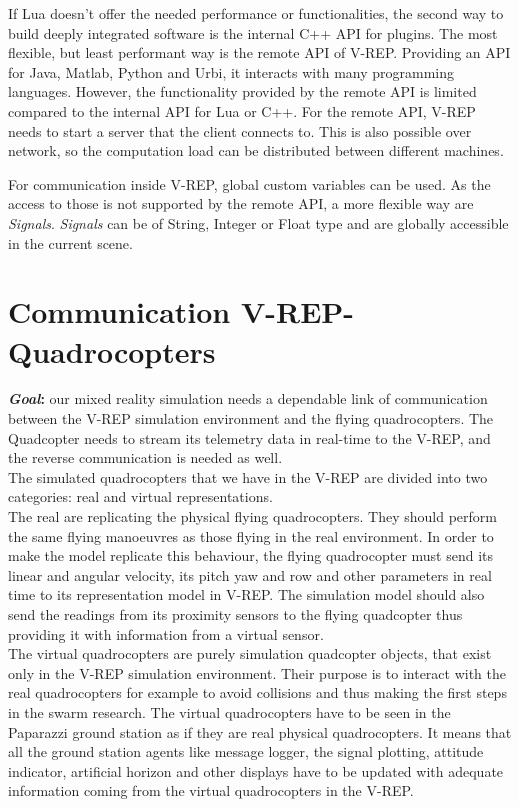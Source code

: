 If Lua doesn't offer the needed performance or functionalities, the second way to build deeply integrated software is the internal C++ API for plugins.  The most flexible, but least performant way is the remote API of V-REP. Providing an API for Java, Matlab, Python and Urbi, it interacts with many programming languages. However, the functionality provided by the remote API is limited compared to the internal API for Lua or C++. For the remote API, V-REP needs to start a server that the client connects to. This is also possible over network, so the computation load can be distributed between different machines.

For communication inside V-REP, global custom variables can be used. As the access to those is not supported by the remote API, a more flexible way are \emph{Signals}. \emph{Signals} can be of String, Integer or Float type and are globally accessible  in the current scene. 










\section{Communication V-REP-Quadrocopters}
\label{sec:comm}
\textbf{\textit{Goal}:} our mixed reality simulation needs a dependable link of communication between the V-REP simulation environment and the flying quadrocopters. The Quadcopter needs to stream its telemetry data in real-time to the V-REP, and the reverse communication is needed as well.\\
The simulated quadrocopters that we have in the V-REP are divided into two categories: real and virtual representations.\\ 
The real are replicating the physical flying quadrocopters. They should perform the same flying manoeuvres as those flying in the real environment. In order to make the model replicate this behaviour, the flying quadrocopter must send its linear and angular velocity, its pitch yaw and row and other parameters in real time to its representation model in V-REP. The simulation model should also send the readings from its proximity sensors to the flying quadcopter thus providing it with information from a virtual sensor. \\
The virtual quadrocopters are purely simulation quadcopter objects, that exist only in the V-REP simulation environment. Their purpose is to interact with the real quadrocopters for example to avoid collisions and thus making the first steps in the swarm research. The virtual quadrocopters have to be seen in the Paparazzi ground station as if they are real physical quadrocopters. It means that all the ground station agents like message logger, the signal plotting, attitude indicator, artificial horizon and other displays have to be updated with adequate information coming from the virtual quadrocopters in the V-REP.

